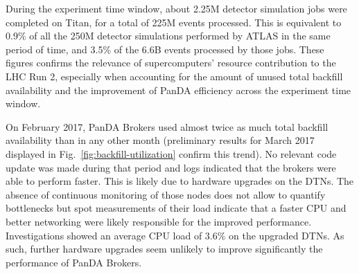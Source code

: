 

During the experiment time window, about 2.25M detector simulation jobs were
completed on Titan, for a total of 225M events processed. This is equivalent to
0.9\% of all the 250M detector simulations performed by ATLAS in the same period
of time, and 3.5\% of the 6.6B events processed by those jobs. These figures
confirms the relevance of supercomputers' resource contribution to the LHC Run
2, especially when accounting for the amount of unused total backfill
availability and the improvement of PanDA efficiency across the experiment time
window.



On February 2017, PanDA Brokers used almost twice as much total backfill
availability than in any other month (preliminary results for March 2017
displayed in Fig.~\ref{fig:backfill-utilization} confirm this trend). No
relevant code update was made during that period and logs indicated that the
brokers were able to perform faster. This is likely due to hardware upgrades on
the DTNs. The absence of continuous monitoring of those nodes does not allow to
quantify bottlenecks but spot measurements of their load indicate that a faster
CPU and better networking were likely responsible for the improved performance.
Investigations showed an average CPU load of 3.6\% on the upgraded DTNs. As
such, further hardware upgrades seem unlikely to improve significantly the
performance of PanDA Brokers.

